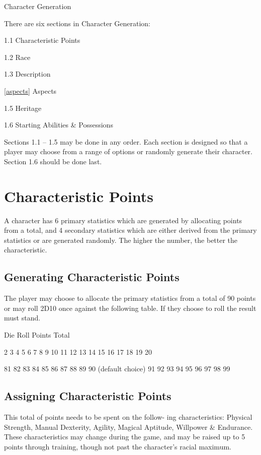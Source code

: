 \begin{Chapter}{Character Generation}

There are six sections in Character Generation: 
\begin{Itemize}
\item 1.1  Characteristic Points 
\item 1.2   Race 
\item 1.3   Description 
\item \ref{aspects}  Aspects
\item 1.5   Heritage 
\item 1.6  Starting Abilities \& Possessions 
\end{Itemize}

Sections 1.1 – 1.5 may be done in any order. Each section is designed
so that a player may choose from a range of options or randomly
generate their character. Section 1.6 should be done last.

\section{Characteristic Points}

A character has 6 primary statistics which are generated by allocating
points from a total, and 4 secondary statistics which are either
derived from the primary statistics or are generated randomly.  The
higher the number, the better the characteristic.

\subsection{Generating Characteristic Points}

The player may choose to allocate the primary statistics from a total
of 90 points or may roll 2D10 once against the following table.  If
they choose to roll the result must stand.

Die Roll  Points Total 

2 
3 
4 
5 
6 
7 
8 
9 
10 
11 
12 
13 
14 
15 
16 
17 
18 
19 
20 

81 
82 
83 
84 
85 
86 
87 
88 
89 
90 (default choice) 
91 
92 
93 
94 
95 
96 
97 
98 
99 

\subsection{Assigning Characteristic Points}

This total of points needs to be spent on the follow- ing
characteristics: Physical Strength, Manual Dexterity, Agility, Magical
Aptitude, Willpower \& Endurance.  These characteristics may change
during the game, and may be raised up to 5 points through training,
though not past the character’s racial maximum.


\end{Chapter}
